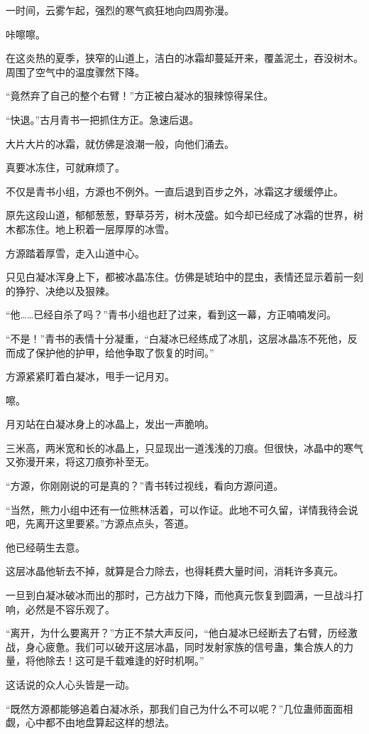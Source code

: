 \begin{this_body}
一时间，云雾乍起，强烈的寒气疯狂地向四周弥漫。

咔嚓嚓。

在这炎热的夏季，狭窄的山道上，洁白的冰霜却蔓延开来，覆盖泥土，吞没树木。周围了空气中的温度骤然下降。

“竟然弃了自己的整个右臂！”方正被白凝冰的狠辣惊得呆住。

“快退。”古月青书一把抓住方正。急速后退。

大片大片的冰霜，就仿佛是浪潮一般，向他们涌去。

真要冰冻住，可就麻烦了。

不仅是青书小组，方源也不例外。一直后退到百步之外，冰霜这才缓缓停止。

原先这段山道，郁郁葱葱，野草芬芳，树木茂盛。如今却已经成了冰霜的世界，树木都冻住。地上积着一层厚厚的冰雪。

方源踏着厚雪，走入山道中心。

只见白凝冰浑身上下，都被冰晶冻住。仿佛是琥珀中的昆虫，表情还显示着前一刻的狰狞、决绝以及狠辣。

“他……已经自杀了吗？”青书小组也赶了过来，看到这一幕，方正喃喃发问。

“不是！”青书的表情十分凝重，“白凝冰已经练成了冰肌，这层冰晶冻不死他，反而成了保护他的护甲，给他争取了恢复的时间。”

方源紧紧盯着白凝冰，甩手一记月刃。

嚓。

月刃站在白凝冰身上的冰晶上，发出一声脆响。

三米高，两米宽和长的冰晶上，只显现出一道浅浅的刀痕。但很快，冰晶中的寒气又弥漫开来，将这刀痕弥补至无。

“方源，你刚刚说的可是真的？”青书转过视线，看向方源问道。

“当然，熊力小组中还有一位熊林活着，可以作证。此地不可久留，详情我待会说吧，先离开这里要紧。”方源点点头，答道。

他已经萌生去意。

这层冰晶他斩去不掉，就算是合力除去，也得耗费大量时间，消耗许多真元。

一旦到白凝冰破冰而出的那时，己方战力下降，而他真元恢复到圆满，一旦战斗打响，必然是不容乐观了。

“离开，为什么要离开？”方正不禁大声反问，“他白凝冰已经断去了右臂，历经激战，身心疲惫。我们可以破开这层冰晶，同时发射家族的信号蛊，集合族人的力量，将他除去！这可是千载难逢的好时机啊。”

这话说的众人心头皆是一动。

“既然方源都能够追着白凝冰杀，那我们自己为什么不可以呢？”几位蛊师面面相觑，心中都不由地盘算起这样的想法。


\end{this_body}
